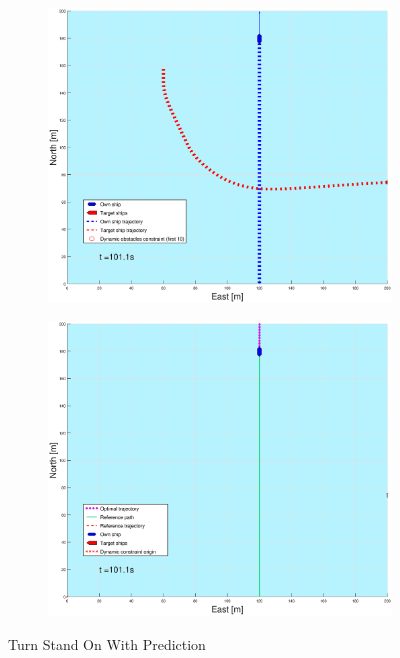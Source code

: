 \begin{figure}[ht]
\begin{subfigure}[b]{0.499\textwidth}
    \end{subfigure}
    \hfill
    \\
    \begin{subfigure}[b]{0.49\textwidth}
        \centering
        \includegraphics[width=\textwidth]{Images/Figures/sving_SO/_Simple_0fig1_time=101}
    \end{subfigure}
    \hfill
    \begin{subfigure}[b]{0.499\textwidth}
        \centering
        \includegraphics[width=\textwidth]{Images/Figures/sving_SO/_Simple_0fig999_time=101}
    \end{subfigure}
    \hfill
    \caption{Turn Stand On With Prediction}
\end{figure}

